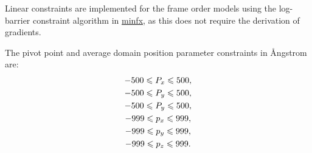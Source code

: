 Linear constraints are implemented for the frame order models using the log-barrier constraint algorithm in \href{https://gna.org/projects/minfx/}{minfx}, as this does not require the derivation of gradients.

The pivot point and average domain position parameter constraints in \AA ngstrom are:
\begin{subequations}
\begin{gather}
    -500 \leqslant P_x \leqslant 500, \\
    -500 \leqslant P_y \leqslant 500, \\
    -500 \leqslant P_y \leqslant 500, \\
    -999 \leqslant p_x \leqslant 999, \\
    -999 \leqslant p_y \leqslant 999, \\
    -999 \leqslant p_z \leqslant 999.
\end{gather}
\end{subequations}

